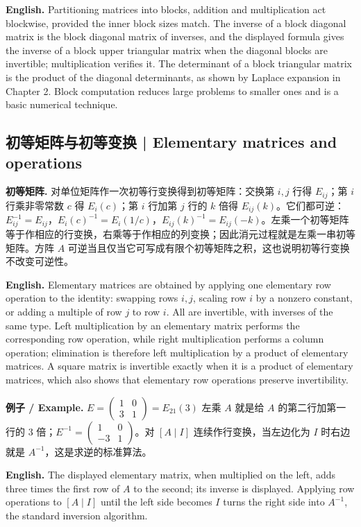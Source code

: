 \documentclass[UTF8,11pt,a4paper]{ctexart}
\newcommand{\EN}[1]{\par\noindent\textbf{English.} #1\par}
\newcommand{\EX}[2]{\par\noindent\textbf{例子 / Example.} #1\par\EN{#2}}
\begin{document}
\EN{Partitioning matrices into blocks, addition and multiplication act blockwise, provided the inner block sizes match. The inverse of a block diagonal matrix is the block diagonal matrix of inverses, and the displayed formula gives the inverse of a block upper triangular matrix when the diagonal blocks are invertible; multiplication verifies it. The determinant of a block triangular matrix is the product of the diagonal determinants, as shown by Laplace expansion in Chapter 2. Block computation reduces large problems to smaller ones and is a basic numerical technique.}

\subsection{初等矩阵与初等变换 | Elementary matrices and operations}
\noindent\textbf{初等矩阵.} 对单位矩阵作一次初等行变换得到初等矩阵：交换第 $i,j$ 行得 $E_{ij}$；第 $i$ 行乘非零常数 $c$ 得 $E_i(c)$；第 $i$ 行加第 $j$ 行的 $k$ 倍得 $E_{ij}(k)$。它们都可逆：$E_{ij}^{-1}=E_{ij}$，$E_i(c)^{-1}=E_i(1/c)$，$E_{ij}(k)^{-1}=E_{ij}(-k)$。左乘一个初等矩阵等于作相应的行变换，右乘等于作相应的列变换；因此消元过程就是左乘一串初等矩阵。方阵 $A$ 可逆当且仅当它可写成有限个初等矩阵之积，这也说明初等行变换不改变可逆性。
\EN{Elementary matrices are obtained by applying one elementary row operation to the identity: swapping rows $i,j$, scaling row $i$ by a nonzero constant, or adding a multiple of row $j$ to row $i$. All are invertible, with inverses of the same type. Left multiplication by an elementary matrix performs the corresponding row operation, while right multiplication performs a column operation; elimination is therefore left multiplication by a product of elementary matrices. A square matrix is invertible exactly when it is a product of elementary matrices, which also shows that elementary row operations preserve invertibility.}
\EX{$E=\begin{pmatrix}1&0\\3&1\end{pmatrix}=E_{21}(3)$ 左乘 $A$ 就是给 $A$ 的第二行加第一行的 $3$ 倍；$E^{-1}=\begin{pmatrix}1&0\\-3&1\end{pmatrix}$。对 $[A\mid I]$ 连续作行变换，当左边化为 $I$ 时右边就是 $A^{-1}$，这是求逆的标准算法。}{The displayed elementary matrix, when multiplied on the left, adds three times the first row of $A$ to the second; its inverse is displayed. Applying row operations to $[A\mid I]$ until the left side becomes $I$ turns the right side into $A^{-1}$, the standard inversion algorithm.}
\end{document}
